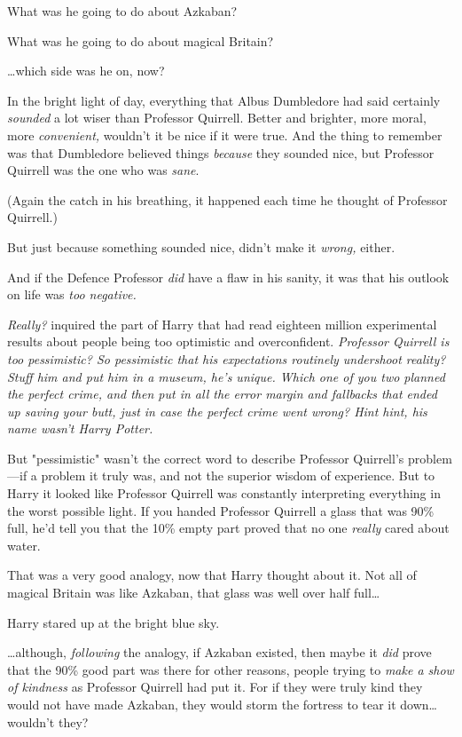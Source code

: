 What was he going to do about Azkaban?

What was he going to do about magical Britain?

…which side was he on, now?

In the bright light of day, everything that Albus Dumbledore had said certainly
\emph{sounded} a lot wiser than Professor Quirrell. Better and brighter, more
moral, more \emph{convenient,} wouldn't it be nice if it were true. And the
thing to remember was that Dumbledore believed things \emph{because} they
sounded nice, but Professor Quirrell was the one who was \emph{sane}.

(Again the catch in his breathing, it happened each time he thought of
Professor Quirrell.)

But just because something sounded nice, didn't make it \emph{wrong,} either.

And if the Defence Professor \emph{did} have a flaw in his sanity, it was that
his outlook on life was \emph{too negative.}

\emph{Really?} inquired the part of Harry that had read eighteen million
experimental results about people being too optimistic and overconfident.
\emph{Professor Quirrell is too pessimistic? So pessimistic that his
expectations routinely \emph{undershoot} reality? Stuff him and put him in a
museum, he's unique. Which one of you two planned the perfect crime, and
\emph{then} put in all the error margin and fallbacks that ended up saving your
butt, \emph{just in case} the perfect crime went wrong? Hint hint, his name
wasn't Harry Potter.}

But "pessimistic" wasn't the correct word to describe Professor Quirrell's
problem—if a problem it truly was, and not the superior wisdom of experience.
But to Harry it looked like Professor Quirrell was constantly interpreting
everything in the worst possible light. If you handed Professor Quirrell a
glass that was 90\% full, he'd tell you that the 10\% empty part proved that no
one \emph{really} cared about water.

That was a very good analogy, now that Harry thought about it. Not all of
magical Britain was like Azkaban, that glass was well over half full…

Harry stared up at the bright blue sky.

…although, \emph{following} the analogy, if Azkaban existed, then maybe
it \emph{did} prove that the 90\% good part was there for other reasons, people
trying to \emph{make a show of kindness} as Professor Quirrell had put it. For
if they were truly kind they would not have made Azkaban, they would storm the
fortress to tear it down…wouldn't they?

